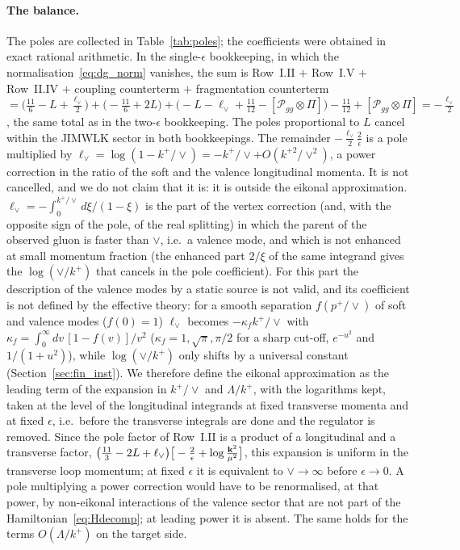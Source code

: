 \paragraph{The balance.} The poles are collected in Table~\ref{tab:poles}; the coefficients were obtained in exact rational arithmetic. In the single-$\epsilon$ bookkeeping, in which the normalisation~\eqref{eq:dg_norm} vanishes, the sum is Row~I.II $+$ Row~I.V $+$ Row~II.IV $+$ coupling counterterm $+$ fragmentation counterterm $=\big(\frac{11}{6}-L+\frac{\ell_\vee}{2}\big)+\big(-\frac{11}{6}+2L\big)+\big(-L-\ell_\vee+\frac{11}{12}-[\mathcal P_{gg}\otimes\Pi]\big)-\frac{11}{12}+[\mathcal P_{gg}\otimes\Pi]=-\frac{\ell_\vee}{2}$, the same total as in the two-$\epsilon$ bookkeeping. The poles proportional to $L$ cancel within the JIMWLK sector in both bookkeepings. The remainder $-\frac{\ell_\vee}{2}\frac2\epsilon$ is a pole multiplied by $\ell_\vee=\log(1-k^+/\vee)=-k^+/\vee+O(k^{+2}/\vee^2)$, a power correction in the ratio of the soft and the valence longitudinal momenta. It is not cancelled, and we do not claim that it is: it is outside the eikonal approximation. $\ell_\vee=-\int_0^{k^+/\vee}d\xi/(1-\xi)$ is the part of the vertex correction (and, with the opposite sign of the pole, of the real splitting) in which the parent of the observed gluon is faster than $\vee$, i.e.\ a valence mode, and which is not enhanced at small momentum fraction (the enhanced part $2/\xi$ of the same integrand gives the $\log(\vee/k^+)$ that cancels in the pole coefficient). For this part the description of the valence modes by a static source is not valid, and its coefficient is not defined by the effective theory: for a smooth separation $f(p^+/\vee)$ of soft and valence modes ($f(0)=1$) $\ell_\vee$ becomes $-\kappa_fk^+/\vee$ with $\kappa_f=\int_0^\infty dv\,[1-f(v)]/v^2$ ($\kappa_f=1,\sqrt\pi,\pi/2$ for a sharp cut-off, $e^{-u^2}$ and $1/(1+u^2)$), while $\log(\vee/k^+)$ only shifts by a universal constant (Section~\ref{sec:fin_inst}). We therefore define the eikonal approximation as the leading term of the expansion in $k^+/\vee$ and $\Lambda/k^+$, with the logarithms kept, taken at the level of the longitudinal integrands at fixed transverse momenta and at fixed $\epsilon$, i.e.\ before the transverse integrals are done and the regulator is removed. Since the pole factor of Row~I.II is a product of a longitudinal and a transverse factor, $\big(\frac{11}{3}-2L+\ell_\vee\big)\big[-\frac2\epsilon+\log\frac{\mathbf{k}^2}{\mu^2}\big]$, this expansion is uniform in the transverse loop momentum; at fixed $\epsilon$ it is equivalent to $\vee\to\infty$ before $\epsilon\to0$. A pole multiplying a power correction would have to be renormalised, at that power, by non-eikonal interactions of the valence sector that are not part of the Hamiltonian~\eqref{eq:Hdecomp}; at leading power it is absent. The same holds for the terms $O(\Lambda/k^+)$ on the target side.


